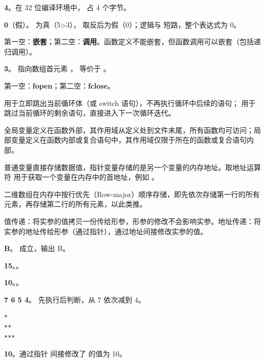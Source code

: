 \documentclass[a4paper,11pt]{article}
\begin{document}
\examtitle



\q \textbf{4}。在 32 位编译环境中， 占 4 个字节。

\q \textbf{0}（假）。 为真（5>3），\code{!} 取反后为假（0）；逻辑与 \code{\&\&} 短路，整个表达式为 0。

\q 第一空：\textbf{嵌套}；第二空：\textbf{调用}。函数定义不能嵌套，但函数调用可以嵌套（包括递归调用）。

\q \textbf{3}。 指向数组首元素 ， 等价于 。

\q 第一空：\textbf{fopen}；第二空：\textbf{fclose}。


\q {} 用于立即跳出当前循环体（或 switch 语句），不再执行循环中后续的语句； 用于跳过当前循环的剩余语句，直接进入下一次循环迭代。

\q 全局变量定义在函数外部，其作用域从定义处到文件末尾，所有函数均可访问；局部变量定义在函数内部或复合语句中，其作用域仅限于所在的函数或复合语句内部。

\q 普通变量直接存储数据值，指针变量存储的是另一个变量的内存地址。取地址运算符 \code{\&} 用于获取一个变量在内存中的首地址，例如 。

\q 二维数组在内存中按行优先（Row-major）顺序存储，即先依次存储第一行的所有元素，再存储第二行的所有元素，以此类推。

\q 值传递：将实参的值拷贝一份传给形参，形参的修改不会影响实参。地址传递：将实参的地址传给形参（通过指针），通过地址间接修改实参的值。


\q \textbf{B}。 成立，输出 B。

\q \textbf{15}。。

\q \textbf{10}。。

\q \textbf{7 6 5 4}。 先执行后判断，从 7 依次减到 4。

\q
\texttt{*}\\
\texttt{**}\\
\texttt{***}

\q \textbf{10}。通过指针  间接修改了  的值为 10。
\end{document}
